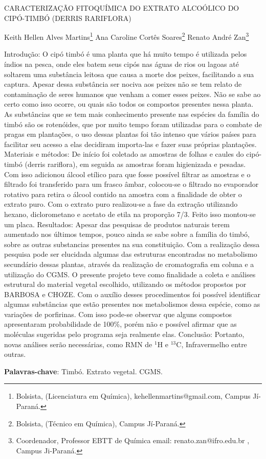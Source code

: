 \documentclass[article,12pt,onesidea,4paper,english,brazil]{abntex2}
\begin{document}
	
	
	\frenchspacing 
	
	\begin{center}
		\LARGE CARACTERIZAÇÃO FITOQUÍMICA DO EXTRATO ALCOÓLICO DO CIPÓ-TIMBÓ (DERRIS RARIFLORA)
		
		\normalsize
		Keith Hellen Alves Martins\footnote{Bolsista, (Licenciatura em Química), kehellenmartins@gmail.com, Campus Jí-Paraná.} 
		Ana Caroline Cortês Soares\footnote{Bolsista, (Técnico em Química), Campus Jí-Paraná.} 
		Renato André Zan\footnote{Coordenador, Professor EBTT de Química email: renato.zan@ifro.edu.br , Campus Ji-Paraná.} 
	\end{center}
	
	\noindent Introdução: O cipó timbó é uma planta que há muito tempo é utilizada pelos índios
	na pesca, onde eles batem seus cipós nas águas de rios ou lagoas até soltarem
	uma substância leitosa que causa a morte dos peixes, facilitando a sua captura.
	Apesar dessa substância ser nociva aos peixes não se tem relato de contaminação
	de seres humanos que venham a comer esses peixes. Não se sabe ao certo como
	isso ocorre, ou quais são todos os compostos presentes nessa planta. As
	substâncias que se tem mais conhecimento presente nas espécies da família do
	timbó são os rotenóides, que por muito tempo foram utilizadas para o combate de
	pragas em plantações, o uso dessas plantas foi tão intenso que vários países para
	facilitar seu acesso a elas decidiram importa-las e fazer suas próprias plantações.
	Materiais e métodos: De início foi coletado as amostras de folhas e caules do cipó-
	timbó (derris rariflora), em seguida as amostras foram higienizada e pesadas. Com
	isso adicionou álcool etílico para que fosse possível filtrar as amostras e o filtrado foi
	transferido para um frasco âmbar, colocou-se o filtrado no evaporador rotativo para
	retira o álcool contido na amostra com a finalidade de obter o extrato puro. Com o
	extrato puro realizou-se a fase da extração utilizando hexano, diclorometano e
	acetato de etila na proporção 7/3. Feito isso montou-se um placa. Resultados:
	Apesar das pesquisas de produtos naturais terem aumentado nos últimos tempos,
	pouco ainda se sabe sobre a família do timbó, sobre as outras substancias
	presentes na sua constituição. Com a realização dessa pesquisa pode ser elucidada
	algumas das estruturas encontradas no metabolismo secundário dessas plantas,
	através da realização de cromatografia em coluna e a utilização do CGMS. O
	presente projeto teve como finalidade a coleta e análises estrutural do material
	vegetal escolhido, utilizando os métodos propostos por BARBOSA e CHOZE. Com o
	auxílio desses procedimentos foi possível identificar algumas substâncias que estão
	presentes nos metabolismos dessa espécie, como as variações de porfirinas. Com
	isso pode-se observar que alguns compostos apresentaram probabilidade de 100\%,
	porém não e possível afirmar que as moléculas sugeridas pelo programa seja
	realmente elas. Conclusão: Portanto, novas análises serão necessárias, como RMN
	de $^{1}$H e $^{13}$C, Infravermelho entre outras.
	
	\vspace{\onelineskip}
	
	\noindent
	\textbf{Palavras-chave}: Timbó. Extrato vegetal. CGMS.
	
\end{document}
